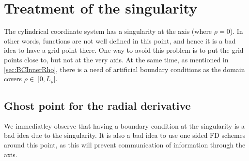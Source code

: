 \section{Treatment of the singularity}
\label{sec:innerCenter}
The cylindrical coordinate system has a singularity at the axis (where $\rho=0$).
In other words, functions are not well defined in this point, and hence it is a bad idea to have a grid point there.
One way to avoid this problem is to put the grid points close to, but not at the very axis.
At the same time, as mentioned in \cref{sec:BCInnerRho}, there is a need of artificial boundary conditions as the domain covers $\rho \in \;]0, L_\rho[$.

\subsection{Ghost point for the radial derivative}
\label{sec:ghostRhoDeriv}
We immediatley observe that having a boundary condition at the singularity is a bad idea due to the singularity.
It is also a bad idea to use one sided FD schemes around this point, as this will prevent communication of information through the axis.

